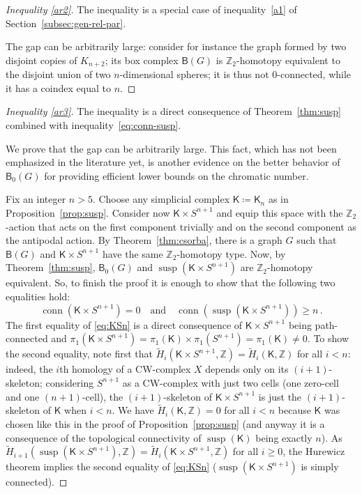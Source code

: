 \documentclass[12pt]{amsart}
\theoremstyle{definition}
\def\Z{\mathbb{Z}}
\def\K{\mathsf{K}}
\def\B{\mathsf{B}}
\renewcommand{\geq}{\geqslant}
\def\susp{\operatorname{susp}}
\def\conn{\operatorname{conn}}
\begin{document}
\begin{proof}[Inequality \eqref{ar2}]
The inequality is a special case of inequality~\eqref{a1} of Section~\ref{subsec:gen-rel-par}.

The gap can be arbitrarily large: consider for instance the graph formed by two disjoint copies of $K_{n+2}$; its box complex $\B(G)$ is $\Z_2$-homotopy equivalent to the disjoint union of two $n$-dimensional spheres; it is thus not $0$-connected, while it has a coindex equal to $n$.
\end{proof}

\begin{proof}[Inequality \eqref{ar3}]
The inequality is a direct consequence of Theorem~\ref{thm:susp} combined with inequality~\eqref{eq:conn-susp}.

We prove that the gap can be arbitrarily large. This fact, which has not been emphasized in the literature yet, is another evidence on the better behavior of $\B_0(G)$ for providing efficient lower bounds on the chromatic number.

Fix an integer $n > 5$. Choose any simplicial complex $\K\coloneqq \K_n$ as in
Proposition~\ref{prop:susp}. Consider now $\K\times S^{n+1}$ and equip this space with the $\Z_2$-action that acts on the first component trivially and on the second component as the antipodal action. By Theorem~\ref{thm:csorba}, there is a graph $G$ such that $\B(G)$ and $ \K\times S^{n+1}$ have the same $\Z_2$-homotopy type. Now, by Theorem~\ref{thm:susp}, $\B_0(G)$ and $\susp(\K \times S^{n+1})$ are $ \Z_2 $-homotopy equivalent. So, to finish the proof it is enough to show that the following two equalities hold: 
\begin{equation}\label{eq:KSn}
\conn( \K \times S^{n+1} )=0 \quad \mbox{and} \quad \conn(  \susp(\K \times S^{n+1}) ) \geq n \, .
\end{equation}
The first equality of \eqref{eq:KSn} is a direct consequence of $\K\times S^{n+1} $ being path-connected and $\pi_1( \K\times S^{n+1} )=\pi_1(\K)\times \pi_1( S^{n+1} ) = \pi_1(\K) \neq 0$. To show the second equality, note first that $ \widetilde{H}_i( \K\times S^{n+1}, \Z) = \widetilde {H}_i(\K, \Z)$ for all $i < n$: indeed, the $i$th homology of a CW-complex $X$ depends only on its $(i+1)$-skeleton; considering $S^{n+1}$ as a CW-complex with just two cells (one zero-cell and one $(n+1)$-cell), the $(i+1)$-skeleton of $\K\times S^{n+1}$ is just the $(i+1)$-skeleton of $\K$ when $i < n$. We have $ \widetilde {H}_i(\K, \Z)=0$ for all $i < n$ because $\K$ was chosen like this in the proof of Proposition~\ref{prop:susp} (and anyway it is a consequence of the topological connectivity of $\susp(\K)$ being exactly $n$). As $\widetilde{H}_{i+1}( \susp(\K\times S^{n+1}), \Z  )= \widetilde {H}_i( \K\times S^{n+1}, \Z)$ for all $i\geq 0$, the Hurewicz theorem implies the second equality of \eqref{eq:KSn} ($\susp(\K\times S^{n+1}) $ is simply connected). 
\end{proof}
\end{document}
